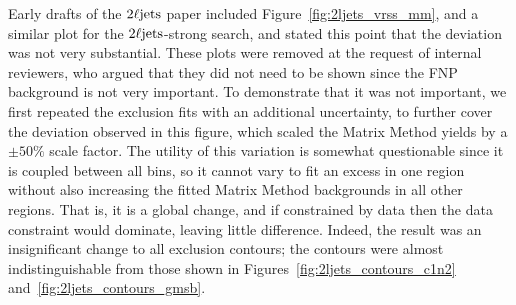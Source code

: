 Early drafts of the $2\ell\mathrm{jets}$ paper included
Figure~\ref{fig:2ljets_vrss_mm}, and a similar plot for the
$2\ell\mathrm{jets}$-strong search, and stated this point that the deviation was not
very substantial.
These plots were removed at the request of internal reviewers, who argued that
they did not need to be shown since the FNP background is not
very important.
To demonstrate that it was not important, we first repeated the exclusion fits
with an additional uncertainty, to further cover the deviation observed in this
figure, which scaled the Matrix Method yields by a $\pm 50\%$ scale factor.
The utility of this variation is somewhat questionable since it is coupled
between all bins, so it cannot vary to fit an excess in one region
without also increasing the fitted Matrix Method backgrounds in all other
regions.
That is, it is a global change, and if constrained by data then the data
constraint would dominate, leaving little difference.
Indeed, the result was an insignificant change to all exclusion contours;
the contours were almost indistinguishable from those shown in
Figures~\ref{fig:2ljets_contours_c1n2} and~\ref{fig:2ljets_contours_gmsb}.

